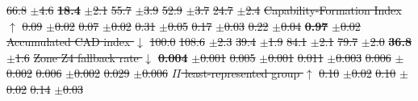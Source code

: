 \documentclass[utf8]{FrontiersinHarvard}
\providecommand{\DIFdel}[1]{{\protect\color{red}\sout{#1}}}                      %
\providecommand{\DIFdelFL}[1]{\DIFdel{#1}} %
\begin{document}
\DIFdelFL{66.8 }%
\DIFdelFL{$\pm$4.6}%
\textbf{\DIFdelFL{18.4}} %
\DIFdelFL{$\pm$2.1}%
\DIFdelFL{55.7 }%
\DIFdelFL{$\pm$3.9}%
\DIFdelFL{52.9 }%
\DIFdelFL{$\pm$3.7}%
\DIFdelFL{24.7 }%
\DIFdelFL{$\pm$2.4}%
\DIFdelFL{Capability-Formation Index $\uparrow$ }%
\DIFdelFL{0.09 }%
\DIFdelFL{$\pm$0.02}%
\DIFdelFL{0.07 }%
\DIFdelFL{$\pm$0.02}%
\DIFdelFL{0.31 }%
\DIFdelFL{$\pm$0.05}%
\DIFdelFL{0.17 }%
\DIFdelFL{$\pm$0.03}%
\DIFdelFL{0.22 }%
\DIFdelFL{$\pm$0.04}%
\textbf{\DIFdelFL{0.97}} %
\DIFdelFL{$\pm$0.02}%
\DIFdelFL{Accumulated CAD index $\downarrow$ }%
\DIFdelFL{100.0 }%
\DIFdelFL{108.6 }%
\DIFdelFL{$\pm$2.3}%
\DIFdelFL{39.4 }%
\DIFdelFL{$\pm$1.9}%
\DIFdelFL{84.1 }%
\DIFdelFL{$\pm$2.1}%
\DIFdelFL{79.7 }%
\DIFdelFL{$\pm$2.0}%
\textbf{\DIFdelFL{36.8}} %
\DIFdelFL{$\pm$1.6}%
\DIFdelFL{Zone Z4 fallback rate $\downarrow$ }%
\textbf{\DIFdelFL{0.004}} %
\DIFdelFL{$\pm$0.001}%
\DIFdelFL{0.005 }%
\DIFdelFL{$\pm$0.001}%
\DIFdelFL{0.011 }%
\DIFdelFL{$\pm$0.003}%
\DIFdelFL{0.006 }%
\DIFdelFL{$\pm$0.002}%
\DIFdelFL{0.006 }%
\DIFdelFL{$\pm$0.002}%
\DIFdelFL{0.029 }%
\DIFdelFL{$\pm$0.006}%
\DIFdelFL{$\Pi$ least-represented group $\uparrow$ }%
\DIFdelFL{0.10 }%
\DIFdelFL{$\pm$0.02}%
\DIFdelFL{0.10 }%
\DIFdelFL{$\pm$0.02}%
\DIFdelFL{0.14 }%
\DIFdelFL{$\pm$0.03}%
\end{document}
